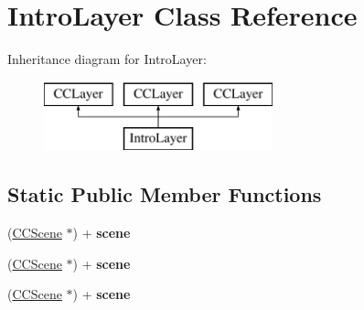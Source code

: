 \hypertarget{interface_intro_layer}{\section{Intro\-Layer Class Reference}
\label{interface_intro_layer}
}
Inheritance diagram for Intro\-Layer\-:\begin{figure}[H]
\begin{center}
\leavevmode
\includegraphics[height=2.000000cm]{interface_intro_layer}
\end{center}
\end{figure}
\subsection*{Static Public Member Functions}
\begin{DoxyCompactItemize}
\item 
\hypertarget{interface_intro_layer_ae7381e7ed64d3694cee457bb2bb9bf75}{(\hyperlink{interface_c_c_scene}{C\-C\-Scene} $\ast$) + {\bfseries scene}}\label{interface_intro_layer_ae7381e7ed64d3694cee457bb2bb9bf75}

\item 
\hypertarget{interface_intro_layer_ae7381e7ed64d3694cee457bb2bb9bf75}{(\hyperlink{interface_c_c_scene}{C\-C\-Scene} $\ast$) + {\bfseries scene}}\label{interface_intro_layer_ae7381e7ed64d3694cee457bb2bb9bf75}

\item 
\hypertarget{interface_intro_layer_ae7381e7ed64d3694cee457bb2bb9bf75}{(\hyperlink{interface_c_c_scene}{C\-C\-Scene} $\ast$) + {\bfseries scene}}\label{interface_intro_layer_ae7381e7ed64d3694cee457bb2bb9bf75}

\end{DoxyCompactItemize}


